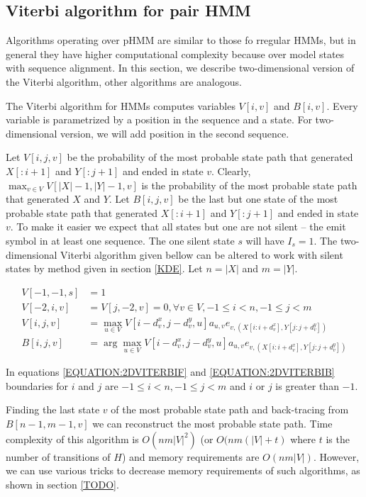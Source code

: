 \subsection{Viterbi algorithm for pair HMM}

Algorithms operating over  pHMM are similar to those fo rregular HMMs, but in
general they have higher computational complexity because over model states with
sequence alignment.
In this section, we describe two-dimensional version of the Viterbi algorithm,
other algorithms are analogous.

The Viterbi algorithm for HMMs computes variables $V[i,v]$ and $B[i,v]$. Every
variable is parametrized by a position in the sequence and a state. For
two-dimensional version, we will add position in the second sequence.

Let $V[i,j,v]$ be the probability of the most probable state path that generated
$X[:i+1]$ and $Y[:j+1]$ and ended in state $v$. Clearly, $\max_{v\in
V}V[|X|-1,|Y|-1,v]$ is the probability of the most probable state path that
generated $X$ and $Y$. Let $B[i,j,v]$ be the last but one state of the most
probable state path that generated $X[:i+1]$ and $Y[:j+1]$ and ended in state
$v$. To make it easier we expect that all states but one are not silent -- the emit
symbol in at least one sequence. The one silent state $s$ will have $I_s=1$.
The two-dimensional Viterbi algorithm given bellow can be altered to work with
silent states by method given in section \ref{KDE}. Let $n=|X|$ and $m=|Y|$.

\begin{align}
V[-1,-1,s] &= 1\\
V[-2,i,v] &= V[j,-2,v] = 0, \forall v\in V,-1 \leq i < n, -1\leq j < m\\
V[i,j,v] &= \max_{u\in
V}V[i-d^x_{v},j-d^y_v,u]a_{u,v}e_{v,(X[i:i+d^x_v],Y[j:j+d^y_v])}\label{EQUATION:2DVITERBIF}\\
B[i,j,v] &= \arg\max_{u\in
V}V[i-d^x_{v},j-d^y_v,u]a_{u,v}e_{v,(X[i:i+d^x_v],Y[j:j+d^y_v])}\label{EQUATION:2DVITERBIB}
\end{align}

In equations \ref{EQUATION:2DVITERBIF} and \ref{EQUATION:2DVITERBIB} boundaries for $i$ and $j$ are $
-1\leq i< n,-1\leq j< m$ and $i$ or $j$ is greater than $-1$.


Finding the last state $v$ of the most probable state path and back-tracing from
$B[n-1,m-1,v]$ we can reconstruct the most probable state path. Time
complexity of this algorithm is $O(nm|V|^2)$ (or $O(nm(|V|+t)$ where $t$
is the number of transitions of $H$) and memory requirements are
$O(nm|V|)$. However, we can use various tricks to decrease memory
requirements of such algorithms, as shown in section \ref{TODO}.

